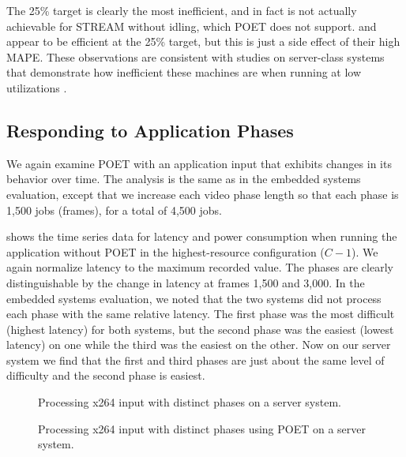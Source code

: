 The 25\% target is clearly the most inefficient, and in fact is not actually achievable for STREAM without idling, which POET does not support.  
 and  appear to be efficient at the 25\% target, but this is just a side effect of their high MAPE.
These observations are consistent with studies on server-class systems that demonstrate how inefficient these machines are when running at low utilizations \cite{google,pupil}.


\subsection{Responding to Application Phases}

We again examine POET with an application input that exhibits changes in its behavior over time.
The analysis is the same as in the embedded systems evaluation, except that we increase each video phase length so that each phase is 1,500 jobs (frames), for a total of 4,500 jobs.

 shows the time series data for latency and power consumption when running the application without POET in the highest-resource configuration ($C-1$).
We again normalize latency to the maximum recorded value.
The phases are clearly distinguishable by the change in latency at frames 1,500 and 3,000.
In the embedded systems evaluation, we noted that the two systems did not process each phase with the same relative latency.
The first phase was the most difficult (highest latency) for both systems, but the second phase was the easiest (lowest latency) on one while the third was the easiest on the other.
Now on our server system we find that the first and third phases are just about the same level of difficulty and the second phase is easiest.

\begin{figure}[t]
  \centering
  
  \caption{Processing x264 input with distinct phases on a server system.}
  \label{fig:poet-server-phases-default}
\end{figure}
\begin{figure}[t]
  \centering
      
  \caption{Processing x264 input with distinct phases using POET on a server system.}
  \label{fig:poet-server-phases-x264}
\end{figure}


